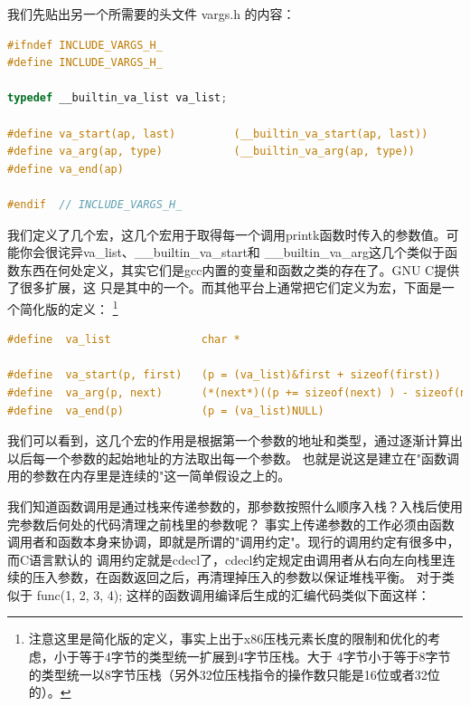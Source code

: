 \par 我们先贴出另一个所需要的头文件 vargs.h 的内容：

\begin{lstlisting}[language = C, label = include/vargs.h, caption = include/vargs.h]
#ifndef INCLUDE_VARGS_H_
#define INCLUDE_VARGS_H_

typedef __builtin_va_list va_list;

#define va_start(ap, last)         (__builtin_va_start(ap, last))
#define va_arg(ap, type)           (__builtin_va_arg(ap, type))
#define va_end(ap) 

#endif 	// INCLUDE_VARGS_H_
\end{lstlisting}

\par 我们定义了几个宏，这几个宏用于取得每一个调用printk函数时传入的参数值。可能你会很诧异va\_list、\_\_builtin\_va\_start和\allowbreak
\_\_builtin\_va\_arg这几个类似于函数东西在何处定义，其实它们是gcc内置的变量和函数之类的存在了。GNU C提供了很多扩展，这\allowbreak
只是其中的一个。而其他平台上通常把它们定义为宏，下面是一个简化版的定义：\allowbreak
\footnote{注意这里是简化版的定义，事实上出于x86压栈元素长度的限制和优化的考虑，小于等于4字节的类型统一扩展到4字节压栈。大于\allowbreak
4字节小于等于8字节的类型统一以8字节压栈（另外32位压栈指令的操作数只能是16位或者32位的）。}

\begin{lstlisting}[language = C, label = 可变形参表, caption = 可变形参表]
#define  va_list              char *

#define  va_start(p, first)   (p = (va_list)&first + sizeof(first))
#define  va_arg(p, next)      (*(next*)((p += sizeof(next) ) - sizeof(next)))
#define  va_end(p)            (p = (va_list)NULL)
\end{lstlisting}

\par 我们可以看到，这几个宏的作用是根据第一个参数的地址和类型，通过逐渐计算出以后每一个参数的起始地址的方法取出每一个参数。\allowbreak
也就是说这是建立在"函数调用的参数在内存里是连续的"这一简单假设之上的。

\par 我们知道函数调用是通过栈来传递参数的，那参数按照什么顺序入栈？入栈后使用完参数后何处的代码清理之前栈里的参数呢？\allowbreak
事实上传递参数的工作必须由函数调用者和函数本身来协调，即就是所谓的"调用约定"。现行的调用约定有很多中，而C语言默认的\allowbreak
调用约定就是cdecl了，cdecl约定规定由调用者从右向左向栈里连续的压入参数，在函数返回之后，再清理掉压入的参数以保证堆栈平衡。\allowbreak
对于类似于 func(1, 2, 3, 4); 这样的函数调用编译后生成的汇编代码类似下面这样：

